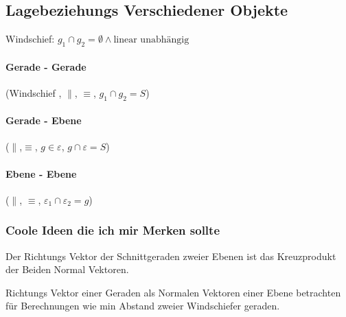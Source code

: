 \documentclass[12pt]{article}
\begin{document}
\subsection*{ Lagebeziehungs Verschiedener Objekte } 

Windschief: \( g_1 \cap g_2 = \emptyset \land \text{linear unabhängig} \)


\paragraph*{ Gerade - Gerade } (Windschief , \( \parallel \), \( \equiv \), \( g_1 \cap g_2 = S \))

\paragraph*{ Gerade - Ebene} (\( \parallel \),\( \equiv \), \( g \in \varepsilon \), \( g \cap \varepsilon = S \))

\paragraph*{ Ebene - Ebene} (\( \parallel \), \( \equiv \), \( \varepsilon_1 \cap \varepsilon_2 = g \))

\subsubsection*{ Coole Ideen die ich mir Merken sollte}

Der Richtungs Vektor der Schnittgeraden zweier Ebenen ist das Kreuzprodukt der Beiden Normal Vektoren. \newline

Richtungs Vektor einer Geraden als Normalen Vektoren einer Ebene betrachten für Berechnungen wie min Abstand zweier Windschiefer geraden.
\end{document}
